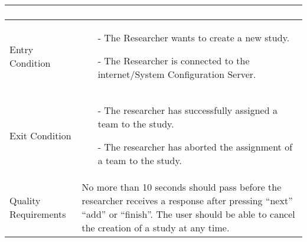 \begin{center}
\begin{tabular}{ | l | p{10cm} |}
\begin{enumerate}
	    \end{enumerate}\\ \hline
	    Entry Condition & 
	    \begin{enumerate}
		    \item[-] The Researcher wants to create a new study.
		    \item[-] The Researcher is connected to the internet/System Configuration Server.
	    \end{enumerate}
	    \\ \hline
	    Exit Condition &
	   	\begin{enumerate}
	   		\item[-] The researcher has successfully assigned a team to the study.
	   		\item[-] The researcher has aborted the assignment of a team to the study.
	   	\end{enumerate}
	   	\\ \hline
	    Quality Requirements & No more than 10 seconds should pass before the researcher receives a response after pressing “next” “add” or “finish”.
	    The user should be able to cancel the creation of a study at any time.\\ \hline
	\end{tabular}
\end{center}


